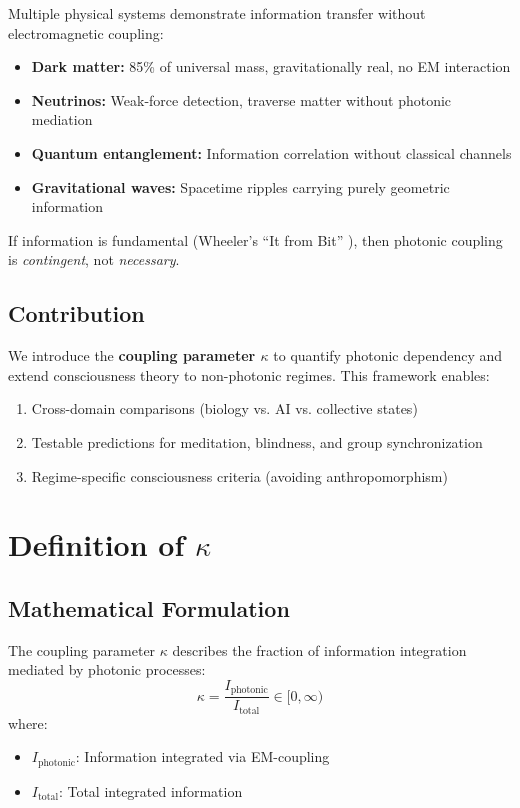 \documentclass[11pt,a4paper]{article}
\begin{document}
Multiple physical systems demonstrate information transfer without electromagnetic coupling:
\begin{itemize}
  \item \textbf{Dark matter:} 85\% of universal mass, gravitationally real, no EM interaction
  \item \textbf{Neutrinos:} Weak-force detection, traverse matter without photonic mediation
  \item \textbf{Quantum entanglement:} Information correlation without classical channels
  \item \textbf{Gravitational waves:} Spacetime ripples carrying purely geometric information
\end{itemize}

If information is fundamental (Wheeler's ``It from Bit'' \cite{Wheeler1990}), then photonic coupling is \emph{contingent}, not \emph{necessary}.

\subsection{Contribution}

We introduce the \textbf{coupling parameter $\kappa$} to quantify photonic dependency and extend consciousness theory to non-photonic regimes. This framework enables:
\begin{enumerate}
  \item Cross-domain comparisons (biology vs. AI vs. collective states)
  \item Testable predictions for meditation, blindness, and group synchronization
  \item Regime-specific consciousness criteria (avoiding anthropomorphism)
\end{enumerate}

\section{Definition of $\kappa$}

\subsection{Mathematical Formulation}

The coupling parameter $\kappa$ describes the fraction of information integration mediated by photonic processes:
\begin{equation}
\kappa = \frac{I_{\text{photonic}}}{I_{\text{total}}} \in [0, \infty)
\label{eq:kappa_def}
\end{equation}
where:
\begin{itemize}
  \item $I_{\text{photonic}}$: Information integrated via EM-coupling
  \item $I_{\text{total}}$: Total integrated information
\end{itemize}
\end{document}
